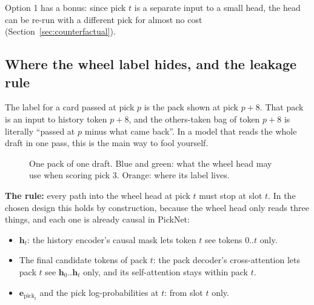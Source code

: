 \documentclass[11pt,letterpaper]{article}
\begin{document}
Option 1 has a bonus: since pick $t$ is a separate input to a small head, the head can be re-run with a
different pick for almost no cost (Section~\ref{sec:counterfactual}).

\subsection{Where the wheel label hides, and the leakage rule}

The label for a card passed at pick $p$ is the pack shown at pick $p+8$. That pack is an input to history
token $p+8$, and the others-taken bag of token $p+8$ is literally ``passed at $p$ minus what came back''.
In a model that reads the whole draft in one pass, this is the main way to fool yourself.

\begin{figure}[!htbp]
\centering
{}
\caption{One pack of one draft. Blue and green: what the wheel head may use when scoring pick 3. Orange:
where its label lives.}
\label{fig:leak}
\end{figure}

\noindent\textbf{The rule:} every path into the wheel head at pick $t$ must stop at slot $t$. In the
chosen design this holds by construction, because the wheel head only reads three things, and each one is
already causal in PickNet:

\begin{itemize}
\item $\mathbf h_t$: the history encoder's causal mask lets token $t$ see tokens $0..t$ only.
\item The final candidate tokens of pack $t$: the pack decoder's cross-attention lets pack $t$ see
$\mathbf h_0..\mathbf h_t$ only, and its self-attention stays within pack $t$.
\item $\mathbf e_{\text{pick}_t}$ and the pick log-probabilities at $t$: from slot $t$ only.
\end{itemize}
\end{document}
